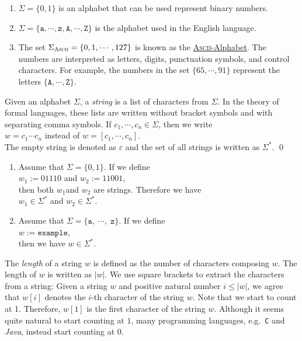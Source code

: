 \examplesEng
\begin{enumerate}
\item $\Sigma = \{ 0, 1\}$ is an alphabet that can be used represent binary numbers.
\item $\Sigma = \{ \mathtt{a}, \cdots, \mathtt{z}, \mathtt{A}, \cdots, \mathtt{Z} \}$ 
      is the alphabet used in the English language.
\item The set $\Sigma_{\textsc{\scriptsize Ascii}} = \{ 0, 1, \cdots, 127 \}$ is known as the
      \href{http://en.wikipedia.org/wiki/ASCII}{\textsc{Ascii}-Alphabet}.  The numbers are
      interpreted as letters, digits, punctuation symbols, and control characters.
      For example, the numbers in the set $\{65, \cdots, 91 \}$ represent the letters
      $\{\mathtt{A}, \cdots, \mathtt{Z}\}$.  
      \eox
\end{enumerate}

\begin{Definition}[Strings]
Given an alphabet $\Sigma$, a \emph{string} is a list of characters from $\Sigma$.
In the theory of formal languages, these lists are written without bracket symbols and with
separating comma symbols.  If $c_1,\cdots,c_n \in \Sigma$, then we write 
\\[0.2cm]
\hspace*{1.3cm}
$w = c_1\cdots c_n$ \quad instead of \quad $w = [c_1,\cdots,c_n]$.
\\[0.2cm]
The empty string is denoted as $\varepsilon$ and  the set of all strings is written as $\Sigma^*$.
\qed
\end{Definition}

\examplesEng
\begin{enumerate}
\item Assume that $\Sigma = \{0, 1\}$.  If we define
      \\[0.2cm]
      \hspace*{1.3cm}
      $w_1 := 01110$ \quad and \quad $w_2 := 11001$,
      \\[0.2cm]
      then both $w_1$and $w_2$ are strings.  Therefore we have
      \\[0.2cm]
      \hspace*{1.3cm}
      $w_1 \in \Sigma^*$ \quad and \quad $w_2 \in \Sigma^*$.
\item Assume that $\Sigma = \{\mathtt{a}, \;\cdots\!,\; \mathtt{z}\}$.   If we define
      \\[0.2cm]
      \hspace*{1.3cm}
      $w := \mathtt{example}$,
      \\[0.2cm]
      then we have $w \in \Sigma^*$. \eox
\end{enumerate}
The \emph{length} of a string $w$ is defined as the number of characters composing $w$.
The length of $w$ is written as $|w|$.  We use square brackets to extract the characters from a string:
Given a string $w$ and positive natural number $i \leq |w|$, we agree that $w[i]$ denotes the $i$-th
character of the string $w$.   Note that we start to count at 1.  Therefore,  $w[1]$ is the first
character of the string $w$.  Although it seems quite natural to start counting at $1$, many
programming languages, e.g.~\texttt{C} and \textsl{Java}, instead start counting at $0$.


